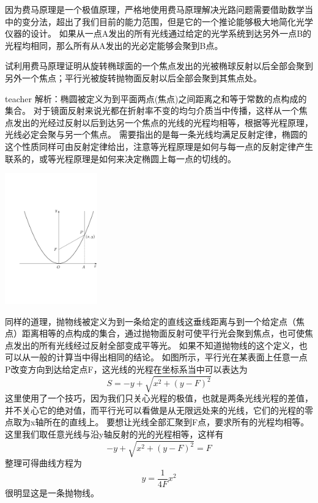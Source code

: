 因为费马原理是一个极值原理，严格地使用费马原理解决光路问题需要借助数学当中的变分法，超出了我们目前的能力范围，但是它的一个推论能够极大地简化光学仪器的设计。
如果从一点A发出的所有光线通过给定的光学系统到达另外一点B的光程均相同，那么所有从A发出的光必定能够会聚到B点。

\begin{example}
试利用费马原理证明从旋转椭球面的一个焦点发出的光被椭球反射以后全部会聚到另外一个焦点；平行光被旋转抛物面反射以后全部会聚到其焦点处。
\begin{taggedblock}{teacher}
\newline
解析：椭圆被定义为到平面两点(焦点)之间距离之和等于常数的点构成的集合。
对于镜面反射来说光都在折射率不变的均匀介质当中传播，这样从一个焦点发出的光经过反射以后到达另一个焦点的光线的光程均相等，根据等光程原理，光线必定会聚与另一个焦点。
需要指出的是每一条光线均满足反射定律，椭圆的这个性质同样可由反射定律给出，注意等光程原理是如何与每一点的反射定律产生联系的，或等光程原理是如何来决定椭圆上每一点的切线的。

\includegraphics[width=0.3\textwidth]{images/parabola-solution.pdf}

同样的道理，抛物线被定义为到一条给定的直线这垂线距离与到一个给定点（焦点）距离相等的点构成的集合，通过抛物面反射可使平行光会聚到焦点，也可使焦点发出的所有光线经过反射全部变成平等光。
如果不知道抛物线的这个定义，也可以从一般的计算当中得出相同的结论。
如图所示，平行光在某表面上任意一点P改变方向到达给定点F，这光线的光程在坐标系当中可以表达为
\[
S = -y + \sqrt{x^2+(y-F)^2}
\]
这里使用了一个技巧，因为我们只关心光程的极值，也就是两条光线光程的差值，并不关心它的绝对值，而平行光可以看做是从无限远处来的光线，它们的光程的零点取为x轴所在的直线上。
要想让光线全部汇聚到F点，要求所有的光程均相等。
这里我们取任意光线与沿y轴反射的光的光程相等，这样有
\[
-y + \sqrt{x^2+(y-F)^2}=F
\]
整理可得曲线方程为
\[
y=\frac{1}{4F}x^2
\]
很明显这是一条抛物线。

\end{taggedblock}
\end{example}


